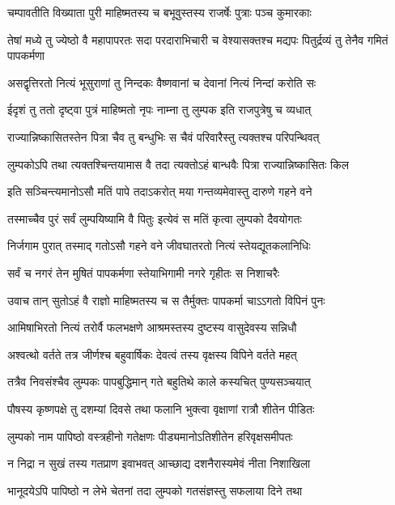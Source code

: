 \twolineshloka
{चम्पावतीति विख्याता पुरी माहिष्मतस्य च}
{बभूवुस्तस्य राजर्षेः पुत्राः पञ्च कुमारकाः}%

\twolineshloka
{तेषां मध्ये तु ज्येष्ठो वै महापापरतः सदा}
{परदाराभिचारी च वेश्यासक्तश्च मद्यपः}%
{पितुर्द्रव्यं तु तेनैव गमितं पापकर्मणा}

\twolineshloka
{असद्वृत्तिरतो नित्यं भूसुराणां तु निन्दकः}%
{वैष्णवानां च देवानां नित्यं निन्दां करोति सः}

\twolineshloka
{ईदृशं तु ततो दृष्ट्वा पुत्रं माहिष्मतो नृपः}%
{नाम्ना तु लुम्पक इति राजपुत्रेषु च व्यधात्}

\twolineshloka
{राज्यान्निष्कासितस्तेन पित्रा चैव तु बन्धुभिः}%
{स चैवं परिवारैस्तु त्यक्तश्च परिपन्थिवत्}

\twolineshloka
{लुम्पकोऽपि तथा त्यक्तश्चिन्तयामास वै तदा}%
{त्यक्तोऽहं बान्धवैः पित्रा राज्यान्निष्कासितः किल}

\twolineshloka
{इति सञ्चिन्त्यमानोऽसौ मतिं पापे तदाऽकरोत्}%
{मया गन्तव्यमेवास्तु दारुणे गहने वने}

\twolineshloka
{तस्माच्चैव पुरं सर्वं लुम्पयिष्यामि वै पितुः}%
{इत्येवं स मतिं कृत्वा लुम्पको दैवयोगतः}

\twolineshloka
{निर्जगाम पुरात् तस्माद् गतोऽसौ गहने वने}%
{जीवघातरतो नित्यं स्तेयद्यूतकलानिधिः}

\twolineshloka
{सर्वं च नगरं तेन मुषितं पापकर्मणा}%
{स्तेयाभिगामी नगरे गृहीतः स निशाचरैः}

\twolineshloka
{उवाच तान् सुतोऽहं वै राज्ञो माहिष्मतस्य च}%
{स तैर्मुक्तः पापकर्मा चाऽऽगतो विपिनं पुनः}

\twolineshloka
{आमिषाभिरतो नित्यं तरोर्वै फलभक्षणे}%
{आश्रमस्तस्य दुष्टस्य वासुदेवस्य सन्निधौ}

\twolineshloka
{अश्वत्थो वर्तते तत्र जीर्णश्च बहुवार्षिकः}%
{देवत्वं तस्य वृक्षस्य विपिने वर्तते महत्}

\twolineshloka
{तत्रैव निवसंश्चैव लुम्पकः पापबुद्धिमान्}%
{गते बहुतिथे काले कस्यचित् पुण्यसञ्चयात्}

\twolineshloka
{पौषस्य कृष्णपक्षे तु दशम्यां दिवसे तथा}%
{फलानि भुक्त्वा वृक्षाणां रात्रौ शीतेन पीडितः}

\twolineshloka
{लुम्पको नाम पापिष्ठो वस्त्रहीनो गतेक्षणः}%
{पीड्यमानोऽतिशीतेन हरिवृक्षसमीपतः}

\twolineshloka
{न निद्रा न सुखं तस्य गतप्राण इवाभवत्}%
{आच्छाद्य दशनैरास्यमेवं नीता निशाखिला}

\twolineshloka
{भानूदयेऽपि पापिष्ठो न लेभे चेतनां तदा}%
{लुम्पको गतसंज्ञस्तु सफलाया दिने तथा}

